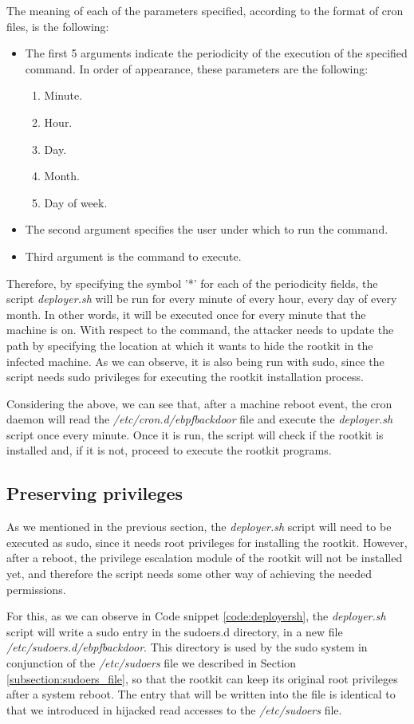The meaning of each of the parameters specified, according to the format of cron files, is the following:
\begin{itemize}
\item The first 5 arguments indicate the periodicity of the execution of the specified command. In order of appearance, these parameters are the following:
\begin{enumerate}
	\item Minute.
	\item Hour.
	\item Day.
	\item Month.
	\item Day of week.
\end{enumerate}
\item The second argument specifies the user under which to run the command. 
\item Third argument is the command to execute.
\end{itemize}

Therefore, by specifying the symbol '*' for each of the periodicity fields, the script \textit{deployer.sh} will be run for every minute of every hour, every day of every month. In other words, it will be executed once for every minute that the machine is on. With respect to the command, the attacker needs to update the path by specifying the location at which it wants to hide the rootkit in the infected machine. As we can observe, it is also being run with sudo, since the script needs sudo privileges for executing the rootkit installation process.

Considering the above, we can see that, after a machine reboot event, the cron daemon will read the \textit{/etc/cron.d/ebpfbackdoor} file and execute the \textit{deployer.sh} script once every minute. Once it is run, the script will check if the rootkit is installed and, if it is not, proceed to execute the rootkit programs.

\subsection{Preserving privileges}
As we mentioned in the previous section, the \textit{deployer.sh} script will need to be executed as sudo, since it needs root privileges for installing the rootkit. However, after a reboot, the privilege escalation module of the rootkit will not be installed yet, and therefore the script needs some other way of achieving the needed permissions.

For this, as we can observe in Code snippet \ref{code:deployersh}, the \textit{deployer.sh} script will write a sudo entry in the sudoers.d directory, in a new file \textit{/etc/sudoers.d/ebpfbackdoor}. This directory is used by the sudo system in conjunction of the \textit{/etc/sudoers} file we described in Section \ref{subsection:sudoers_file}, so that the rootkit can keep its original root privileges after a system reboot. The entry that will be written into the file is identical to that we introduced in hijacked read accesses to the \textit{/etc/sudoers} file.

